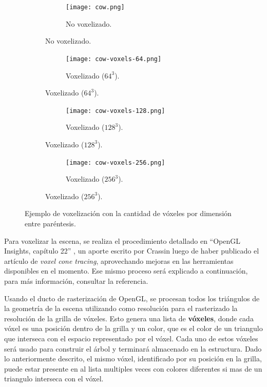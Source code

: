 \begin{figure}[ht]
    \begin{subfigure}{.50\textwidth}
        \centering
        \begin{subfigure}{.60\textwidth}
            \centering
            \texttt{[image: cow.png]}
            \caption{No voxelizado.}
        \end{subfigure}
    \end{subfigure}
    \begin{subfigure}{.50\textwidth}
        \centering
        \begin{subfigure}{.60\textwidth}
            \centering
            \texttt{[image: cow-voxels-64.png]}
            \caption{Voxelizado ($64^3$).}
        \end{subfigure}
    \end{subfigure}
    \begin{subfigure}{.50\textwidth}
        \centering
        \begin{subfigure}{.60\textwidth}
            \centering
            \texttt{[image: cow-voxels-128.png]}
            \caption{Voxelizado ($128^3$).}
        \end{subfigure}
    \end{subfigure}
    \begin{subfigure}{.50\textwidth}
        \centering
        \begin{subfigure}{.60\textwidth}
            \centering
            \texttt{[image: cow-voxels-256.png]}
            \caption{Voxelizado ($256^3$).}
        \end{subfigure}
    \end{subfigure}
    \caption{Ejemplo de voxelización con la cantidad de vóxeles por dimensión entre paréntesis.}
    \label{fig:voxelized-cow}
\end{figure}

Para voxelizar la escena, se realiza el procedimiento detallado en ``OpenGL Insights, capítulo 22'' \cite{opengl-insights}, un aporte escrito por Crassin luego de haber publicado el artículo de \textit{voxel cone tracing}, aprovechando mejoras en las herramientas disponibles en el momento.
Ese mismo proceso será explicado a continuación, para más información, consultar la referencia.

Usando el ducto de rasterización de OpenGL, se procesan todos los triángulos de la geometría de la escena utilizando como resolución para el rasterizado la resolución de la grilla de vóxeles.
Esto genera una lista de \textbf{vóxeles}, donde cada vóxel es una posición dentro de la grilla y un color, que es el color de un triangulo que interseca con el espacio representado por el vóxel.
Cada uno de estos vóxeles será usado para construir el árbol y terminará almacenado en la estructura. Dado lo anteriormente descrito, el mismo vóxel, identificado por su posición en la grilla, puede estar presente en al lista multiples veces con colores diferentes si mas de un triangulo interseca con el vóxel. 

